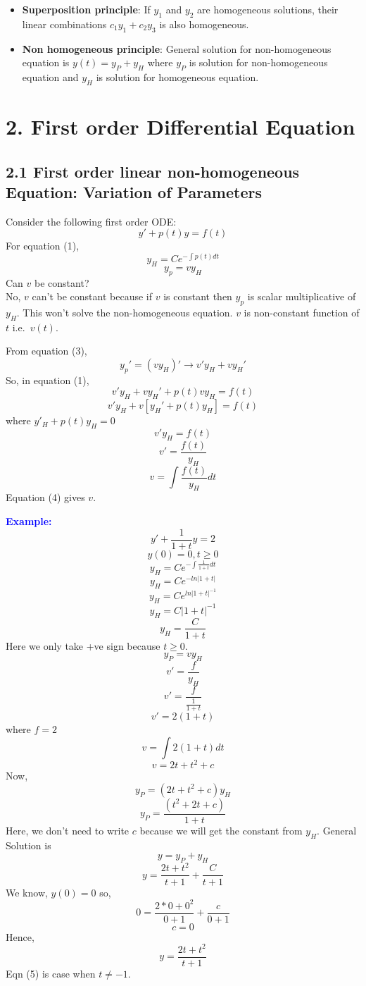 \documentclass[
  11pt,
]{article}
\providecommand{\tightlist}{%
  \setlength{\itemsep}{0pt}\setlength{\parskip}{0pt}}
\begin{document}
\begin{itemize}
\tightlist
\item
  \textbf{Superposition principle}: If \(y_1\) and \(y_2\) are
  homogeneous solutions, their linear combinations \(c_1y_1 + c_2y_3\)
  is also homogeneous.
\item
  \textbf{Non homogeneous principle}: General solution for
  non-homogeneous equation is \(y(t) = y_P + y_H\) where \(y_P\) is
  solution for non-homogeneous equation and \(y_H\) is solution for
  homogeneous equation.
\end{itemize}

\newpage

\section{2. First order Differential
Equation}\label{first-order-differential-equation}

\subsection{2.1 First order linear non-homogeneous Equation: Variation
of
Parameters}\label{first-order-linear-non-homogeneous-equation-variation-of-parameters}

Consider the following first order ODE: \[y'+p(t)y=f(t) \tag{1}\] For
equation (1), \[y_H=Ce^{-\int{p(t)dt}} \tag{2}\] \[y_p=vy_H \tag{3}\]
Can \(v\) be constant?\\
No, \(v\) can't be constant because if \(v\) is constant then \(y_p\) is
scalar multiplicative of \(y_H\). This won't solve the non-homogeneous
equation. \(v\) is non-constant function of \(t\) i.e.~\(v(t)\).

From equation (3), \[y_p'=(vy_H)' \longrightarrow v'y_H+vy_H'\] So, in
equation (1), \[v'y_H+vy_H'+p(t)vy_H=f(t)\]
\[v'y_H+v[y_H'+p(t)y_H]=f(t)\] where \(y'_H+p(t)y_H=0\) \[v'y_H=f(t)\]
\[v'=\frac{f(t)}{y_H}\] \[v=\int\frac{f(t)}{y_H}dt \tag{4}\] Equation
(4) gives \(v\).

\textbf{\textcolor{blue}{Example:}} \[y'+\frac{1}{1+t}y=2\]
\[y(0)=0, t\geq0\] \[y_H=Ce^{-\int\frac{1}{1+t}dt}\]
\[y_H=Ce^{-ln|1+t|}\] \[y_H=Ce^{ln|1+t|^{-1}}\] \[y_H=C|1+t|^{-1}\]
\[y_H=\frac{C}{1+t} \tag{1}\] Here we only take +ve sign because
\(t\geq0\). \[y_P=vy_H\] \[v'=\frac{f}{y_H}\]
\[v'=\frac{f}{\frac{1}{1+t}}\] \[v'=2(1+t)\] where \(f=2\)
\[v=\int{2(1+t)}dt\] \[v=2t+t^2+c \tag{2}\] Now, \[y_P=(2t+t^2+c)y_H\]
\[y_P=\frac{(t^2+2t+c)}{1+t} \tag{3}\] Here, we don't need to write
\(c\) because we will get the constant from \(y_H\). General Solution is
\[y=y_P+y_H\] \[y=\frac{2t+t^2}{t+1}+\frac{C}{t+1} \tag{4}\] We know,
\(y(0)=0\) so, \[0=\frac{2*0+0^2}{0+1}+\frac{c}{0+1}\] \[c=0\] Hence,
\[y=\frac{2t+t^2}{t+1} \tag{5}\] Eqn (5) is case when \(t\neq-1\).
\newpage
\end{document}
